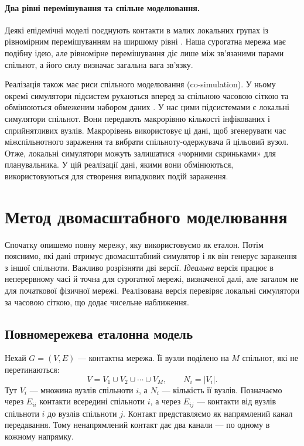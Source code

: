 \paragraph{Два рівні перемішування та спільне моделювання.}
Деякі епідемічні моделі поєднують контакти в малих локальних групах із рівномірним перемішуванням на ширшому рівні \citep{ball1997}. Наша сурогатна мережа має подібну ідею, але рівномірне перемішування діє лише між зв'язаними парами спільнот, а його силу визначає загальна вага зв'язку.

Реалізація також має риси спільного моделювання (co-simulation). У ньому окремі симулятори підсистем рухаються вперед за спільною часовою сіткою та обмінюються обмеженим набором даних \citep{gomes2018cosim}. У нас цими підсистемами є локальні симулятори спільнот. Вони передають макрорівню кількості інфікованих і сприйнятливих вузлів. Макрорівень використовує ці дані, щоб згенерувати час міжспільнотного зараження та вибрати спільноту-одержувача й цільовий вузол. Отже, локальні симулятори можуть залишатися «чорними скриньками» для планувальника. У цій реалізації дані, якими вони обмінюються, використовуються для створення випадкових подій зараження.

\clearpage
\section{Метод двомасштабного моделювання}
\label{sec:method}

Спочатку опишемо повну мережу, яку використовуємо як еталон. Потім пояснимо, які дані отримує двомасштабний симулятор і як він генерує зараження з іншої спільноти. Важливо розрізняти дві версії. \emph{Ідеальна} версія працює в неперервному часі й точна для сурогатної мережі, визначеної далі, але загалом не для початкової фізичної мережі. Реалізована версія перевіряє локальні симулятори за часовою сіткою, що додає чисельне наближення.

\subsection{Повномережева еталонна модель}
\label{sec:reference}

Нехай $G=(V,E)$ --- контактна мережа. Її вузли поділено на $M$ спільнот, які не перетинаються:
\begin{equation}
\label{eq:partition}
V=V_1\cup V_2\cup\cdots\cup V_M,
\qquad N_i=|V_i|.
\end{equation}
Тут $V_i$ --- множина вузлів спільноти $i$, а $N_i$ --- кількість її вузлів. Позначаємо через $E_{ii}$ контакти всередині спільноти $i$, а через $E_{ij}$ --- контакти від вузлів спільноти $i$ до вузлів спільноти $j$. Контакт представляємо як напрямлений канал передавання. Тому ненапрямлений контакт дає два канали --- по одному в кожному напрямку.

